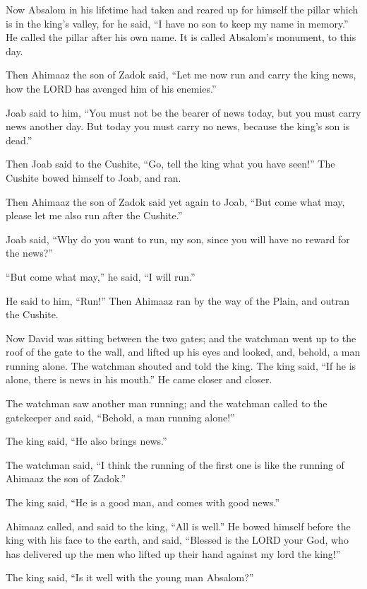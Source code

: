 \myverse{}Now Absalom in his lifetime had taken and reared up for himself
the pillar which is in the king’s valley, for he said, “I have no son to keep my name in memory.” He called
the pillar after his own name. It is called Absalom’s monument, to this day.

\myverse{}Then Ahimaaz the son of Zadok said, “Let me now run and carry
the king news, how the LORD has avenged him of his enemies.”

\myverse{}Joab said to him, “You must not be the bearer of news today,
but you must carry news another day. But today you must carry no news, because the king’s son is dead.”

\myverse{}Then Joab said to the Cushite, “Go, tell the king what you have
seen!” The Cushite bowed himself to Joab, and ran.

\myverse{}Then Ahimaaz the son of Zadok said yet again to Joab, “But come
what may, please let me also run after the Cushite.”

Joab said, “Why do you want to run, my son, since you will have no reward for the news?”

\myverse{}“But come what may,” he said, “I will run.”

He said to him, “Run!” Then Ahimaaz ran by the way of the Plain, and outran the Cushite.

\myverse{}Now David was sitting between the two gates; and the watchman
went up to the roof of the gate to the wall, and lifted up his eyes and looked, and, behold, a man running
alone.
\myverse{}The watchman shouted and told the king. The king said, “If he is alone, there
is news in his mouth.” He came closer and closer.

\myverse{}The watchman saw another man running; and the watchman called
to the gatekeeper and said, “Behold, a man running alone!”

The king said, “He also brings news.”

\myverse{}The watchman said, “I think the running of the first one is
like the running of Ahimaaz the son of Zadok.”

The king said, “He is a good man, and comes with good news.”

\myverse{}Ahimaaz called, and said to the king, “All is well.” He bowed
himself before the king with his face to the earth, and said, “Blessed is the LORD your God, who has delivered
up the men who lifted up their hand against my lord the king!”

\myverse{}The king said, “Is it well with the young man Absalom?”

